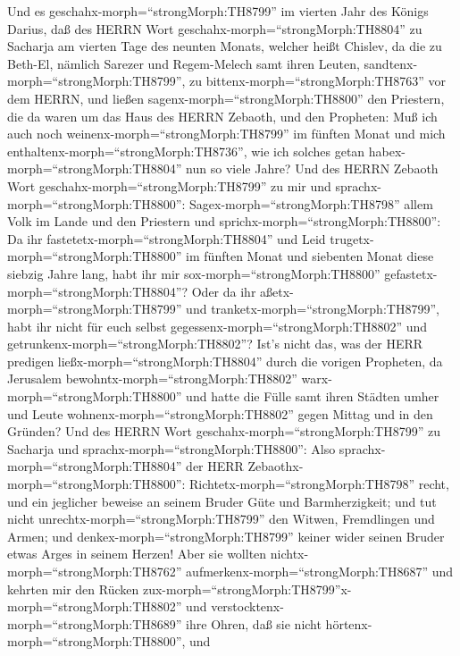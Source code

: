  Und es geschahx-morph=``strongMorph:TH8799'' im vierten
Jahr des Königs Darius, daß des HERRN Wort
geschahx-morph=``strongMorph:TH8804'' zu Sacharja am vierten Tage des
neunten Monats, welcher heißt Chislev,  da die zu Beth-El,
nämlich Sarezer und Regem-Melech samt ihren Leuten,
sandtenx-morph=``strongMorph:TH8799'', zu
bittenx-morph=``strongMorph:TH8763'' vor dem HERRN,  und
ließen sagenx-morph=``strongMorph:TH8800'' den Priestern, die da waren
um das Haus des HERRN Zebaoth, und den Propheten: Muß ich auch noch
weinenx-morph=``strongMorph:TH8799'' im fünften Monat und mich
enthaltenx-morph=``strongMorph:TH8736'', wie ich solches getan
habex-morph=``strongMorph:TH8804'' nun so viele Jahre?  Und
des HERRN Zebaoth Wort geschahx-morph=``strongMorph:TH8799'' zu mir und
sprachx-morph=``strongMorph:TH8800'': 
Sagex-morph=``strongMorph:TH8798'' allem Volk im Lande und den Priestern
und sprichx-morph=``strongMorph:TH8800'': Da ihr
fastetetx-morph=``strongMorph:TH8804'' und Leid
trugetx-morph=``strongMorph:TH8800'' im fünften Monat und siebenten
Monat diese siebzig Jahre lang, habt ihr mir
sox-morph=``strongMorph:TH8800'' gefastetx-morph=``strongMorph:TH8804''?
 Oder da ihr aßetx-morph=``strongMorph:TH8799'' und
tranketx-morph=``strongMorph:TH8799'', habt ihr nicht für euch selbst
gegessenx-morph=``strongMorph:TH8802'' und
getrunkenx-morph=``strongMorph:TH8802''?  Ist's nicht das,
was der HERR predigen ließx-morph=``strongMorph:TH8804'' durch die
vorigen Propheten, da Jerusalem bewohntx-morph=``strongMorph:TH8802''
warx-morph=``strongMorph:TH8800'' und hatte die Fülle samt ihren Städten
umher und Leute wohnenx-morph=``strongMorph:TH8802'' gegen Mittag und in
den Gründen?  Und des HERRN Wort
geschahx-morph=``strongMorph:TH8799'' zu Sacharja und
sprachx-morph=``strongMorph:TH8800'':  Also
sprachx-morph=``strongMorph:TH8804'' der HERR
Zebaothx-morph=``strongMorph:TH8800'':
Richtetx-morph=``strongMorph:TH8798'' recht, und ein jeglicher beweise
an seinem Bruder Güte und Barmherzigkeit;  und tut nicht
unrechtx-morph=``strongMorph:TH8799'' den Witwen, Fremdlingen und Armen;
und denkex-morph=``strongMorph:TH8799'' keiner wider seinen Bruder etwas
Arges in seinem Herzen!  Aber sie wollten
nichtx-morph=``strongMorph:TH8762''
aufmerkenx-morph=``strongMorph:TH8687'' und kehrten mir den Rücken
zux-morph=``strongMorph:TH8799''x-morph=``strongMorph:TH8802'' und
verstocktenx-morph=``strongMorph:TH8689'' ihre Ohren, daß sie nicht
hörtenx-morph=``strongMorph:TH8800'',  und
